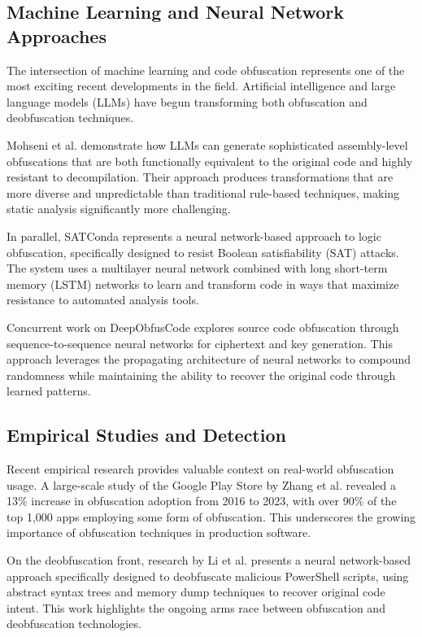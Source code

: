 \documentclass[conference]{IEEEtran}
\begin{document}
\subsection{Machine Learning and Neural Network Approaches}
The intersection of machine learning and code obfuscation represents one of the most exciting recent developments in the field. Artificial intelligence and large language models (LLMs) have begun transforming both obfuscation and deobfuscation techniques.

Mohseni et al. \cite{aicodeobfs} demonstrate how LLMs can generate sophisticated assembly-level obfuscations that are both functionally equivalent to the original code and highly resistant to decompilation. Their approach produces transformations that are more diverse and unpredictable than traditional rule-based techniques, making static analysis significantly more challenging.

In parallel, SATConda \cite{wang2023satconda} represents a neural network-based approach to logic obfuscation, specifically designed to resist Boolean satisfiability (SAT) attacks. The system uses a multilayer neural network combined with long short-term memory (LSTM) networks to learn and transform code in ways that maximize resistance to automated analysis tools.

Concurrent work on DeepObfusCode \cite{haq2023deepobfuscode} explores source code obfuscation through sequence-to-sequence neural networks for ciphertext and key generation. This approach leverages the propagating architecture of neural networks to compound randomness while maintaining the ability to recover the original code through learned patterns.

\subsection{Empirical Studies and Detection}
Recent empirical research provides valuable context on real-world obfuscation usage. A large-scale study of the Google Play Store by Zhang et al. \cite{zhang2024empirical} revealed a 13\% increase in obfuscation adoption from 2016 to 2023, with over 90\% of the top 1,000 apps employing some form of obfuscation. This underscores the growing importance of obfuscation techniques in production software.

On the deobfuscation front, research by Li et al. \cite{li2024powerastnn} presents a neural network-based approach specifically designed to deobfuscate malicious PowerShell scripts, using abstract syntax trees and memory dump techniques to recover original code intent. This work highlights the ongoing arms race between obfuscation and deobfuscation technologies.
\end{document}
